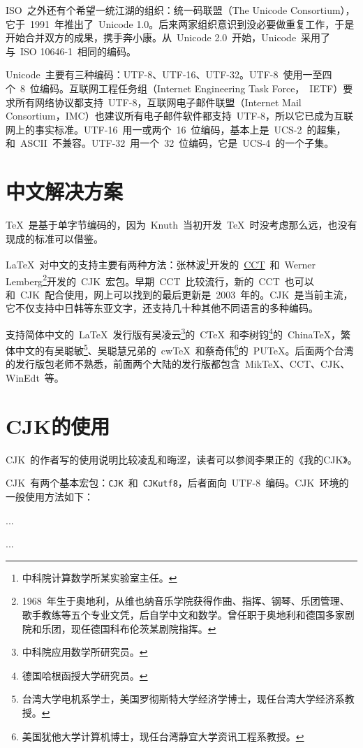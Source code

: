 ISO~之外还有个希望一统江湖的组织：统一码联盟（The Unicode Consortium），它于~1991~年推出了~Unicode 1.0。后来两家组织意识到没必要做重复工作，于是开始合并双方的成果，携手奔小康。从~Unicode 2.0~开始，Unicode~采用了与~ISO 10646-1~相同的编码。

Unicode~主要有三种编码：UTF-8、UTF-16、UTF-32。UTF-8~使用一至四个~8~位编码。互联网工程任务组（Internet Engineering Task Force，~IETF）要求所有网络协议都支持~UTF-8，互联网电子邮件联盟（Internet Mail Consortium，IMC）也建议所有电子邮件软件都支持~UTF-8，所以它已成为互联网上的事实标准。UTF-16~用一或两个~16~位编码，基本上是~UCS-2~的超集，和~ASCII~不兼容。UTF-32~用一个~32~位编码，它是~UCS-4~的一个子集。

\section{中文解决方案}
\TeX~是基于单字节编码的，因为~Knuth~当初开发~\TeX~时没考虑那么远，也没有现成的标准可以借鉴。

\LaTeX~对中文的支持主要有两种方法：张林波\footnote{中科院计算数学所某实验室主任。}开发的~\href{ftp://ftp.cc.ac.cn/pub/cct/}{CCT}~和~Werner Lemberg\footnote{1968~年生于奥地利，从维也纳音乐学院获得作曲、指挥、钢琴、乐团管理、歌手教练等五个专业文凭，后自学中文和数学。曾任职于奥地利和德国多家剧院和乐团，现任德国科布伦茨某剧院指挥。}开发的~CJK~宏包。早期~CCT~比较流行，新的~CCT~也可以和~CJK~配合使用，网上可以找到的最后更新是~2003~年的。CJK~是当前主流，它不仅支持中日韩等东亚文字，还支持几十种其他不同语言的多种编码。

支持简体中文的~\LaTeX~发行版有吴凌云\footnote{中科院应用数学所研究员。}的~CTeX~和李树钧\footnote{德国哈根函授大学研究员。}的~ChinaTeX，繁体中文的有吴聪敏\footnote{台湾大学电机系学士，美国罗彻斯特大学经济学博士，现任台湾大学经济系教授。}、吴聪慧兄弟的~cwTeX~和蔡奇伟\footnote{美国犹他大学计算机博士，现任台湾静宜大学资讯工程系教授。}的~PUTeX。后面两个台湾的发行版包老师不熟悉，前面两个大陆的发行版都包含~MikTeX、CCT、CJK、WinEdt~等。

\section{CJK的使用}
CJK~的作者写的使用说明比较凌乱和晦涩，读者可以参阅李果正的《我的CJK》\citep{Lee_2004a}。

CJK~有两个基本宏包：\verb|CJK|~和~\verb|CJKutf8|，后者面向~UTF-8~编码。CJK~环境的一般使用方法如下：

\begin{code}
\usepackage{CJK(utf8)}
...

\begin{CJK}{<encoding>}{<family>}
...
\end{CJK}

\end{code}

